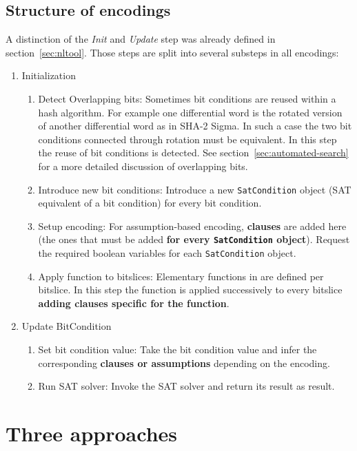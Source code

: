\subsection{Structure of encodings}
\label{sec:encoding-structure}
%
A distinction of the \emph{Init} and \emph{Update} step was already defined in section~\ref{sec:nltool}. Those steps are split into several substeps in all encodings:
\begin{enumerate}
  \item Initialization
    \begin{enumerate}
      \item Detect Overlapping bits: Sometimes bit conditions are reused within a hash algorithm. For example one differential word is the rotated version of another differential word as in SHA-2 Sigma. In such a case the two bit conditions connected through rotation must be equivalent. In this step the reuse of bit conditions is detected. See section~\ref{sec:automated-search} for a more detailed discussion of overlapping bits.
      \item Introduce new bit conditions: Introduce a new \texttt{SatCondition} object (SAT equivalent of a bit condition) for every bit condition.
      \item Setup encoding: For assumption-based encoding, \textbf{clauses} are added here (the ones that must be added \textbf{for every \texttt{SatCondition} object}). Request the required boolean variables for each \texttt{SatCondition} object.
      \item Apply function to bitslices: Elementary functions in \nltool{} are defined per bitslice. In this step the function is applied successively to every bitslice \textbf{adding clauses specific for the function}.
    \end{enumerate}
  \item Update BitCondition
    \begin{enumerate}
      \item Set bit condition value: Take the bit condition value and infer the corresponding \textbf{clauses or assumptions} depending on the encoding.
      \item Run SAT solver: Invoke the SAT solver and return its result as result.
    \end{enumerate}
\end{enumerate}

\section{Three approaches}
\label{sec:three-approaches}

